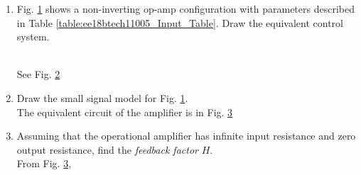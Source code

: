 \begin{enumerate}[label=\thesubsection.\arabic*.,ref=\thesubsection.\theenumi]

\item Fig. \ref{fig:ee18btech11005_original_circuit} shows a  non-inverting op-amp configuration   with parameters described in Table \ref{table:ee18btech11005_Input_Table}.  Draw the equivalent control system.
\renewcommand{\thefigure}{\theenumi.\arabic{figure}}
%
\begin{figure}[!ht]
	\begin{center}
		
		\resizebox{\columnwidth}{!}{}
	\end{center}
\caption{}
\label{fig:ee18btech11005_original_circuit}
\end{figure}
%
\begin{table}[!ht]
\centering

\caption{}
\label{table:ee18btech11005_Input_Table}
\end{table}
\\
\solution  See 	Fig. \ref{fig:ee18btech11005_equivalent_control_system}
\begin{figure}[!ht]
	\begin{center}
			\resizebox{\columnwidth}{!}{}
	\end{center}
\caption{}
\label{fig:ee18btech11005_equivalent_control_system}
\end{figure}
\renewcommand{\thefigure}{\theenumi}

\item Draw the small signal model for Fig. \ref{fig:ee18btech11005_original_circuit}.
\\
\solution
The equivalent circuit of the amplifier is in Fig. \ref{fig:ee18btech11005_equivalent_circuit}
\begin{figure}[!ht]
	\begin{center}
		
		\resizebox{\columnwidth}{!}{}
	\end{center}
\caption{}
\label{fig:ee18btech11005_equivalent_circuit}
\end{figure}

\item Assuming that the operational amplifier has infinite input resistance and zero output resistance, find  the {\em feedback factor} $H$.
\\
\solution From Fig. \ref{fig:ee18btech11005_equivalent_circuit},


\end{enumerate}
